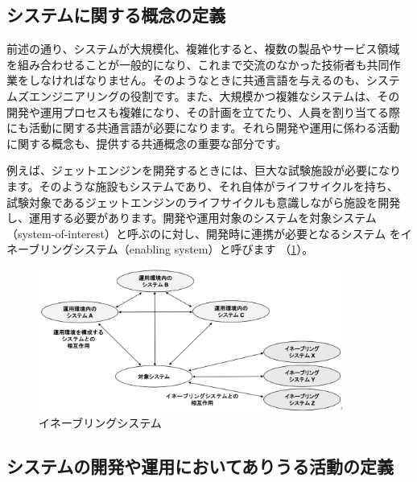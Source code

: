 \subsection{システムに関する概念の定義}
前述の通り、システムが大規模化、複雑化すると、複数の製品やサービス領域
を組み合わせることが一般的になり、これまで交流のなかった技術者も共同作
業をしなければなりません。そのようなときに共通言語を与えるのも、システ
ムズエンジニアリングの役割です。また、大規模かつ複雑なシステムは、その
開発や運用プロセスも複雑になり、その計画を立てたり、人員を割り当てる際
にも活動に関する共通言語が必要になります。それら開発や運用に係わる活動
に関する概念も、提供する共通概念の重要な部分です。

例えば、ジェットエンジンを開発するときには、巨大な試験施設が必要になり
ます。そのような施設もシステムであり、それ自体がライフサイクルを持ち、
試験対象であるジェットエンジンのライフサイクルも意識しながら施設を開発
し、運用する必要があります。開発や運用対象のシステムを対象システム
（system-of-interest）と呼ぶのに対し、開発時に連携が必要となるシステム
をイネーブリングシステム（enabling system）と呼びます
（\ref{figure:ch4-1}）。
\begin{figure}
    \begin{center}
    \includegraphics[width=100mm,bb=0 0 622 293]{safety_assurance_contents/ch4images/fig1.png}
    \caption{イネーブリングシステム}
    \label{figure:ch4-1}
    \end{center}
\end{figure}

\subsection{システムの開発や運用においてありうる活動の定義}

